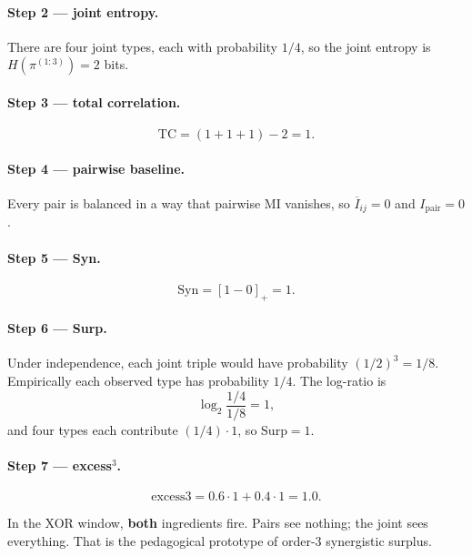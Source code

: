 \documentclass[11pt,a4paper]{article}
\begin{document}
\paragraph{Step 2 --- joint entropy.}
There are four joint types, each with probability $1/4$, so the joint
entropy is $H(\pi^{(1:3)})=2$ bits.

\paragraph{Step 3 --- total correlation.}
\begin{equation*}
\mathrm{TC}
=
(1+1+1)-2
=
1.
\end{equation*}

\paragraph{Step 4 --- pairwise baseline.}
Every pair is balanced in a way that pairwise MI vanishes, so
$\overline{I}_{ij}=0$ and $I_{\mathrm{pair}}=0$.

\paragraph{Step 5 --- Syn.}
\begin{equation*}
\mathrm{Syn}
=
[1-0]_+
=
1.
\end{equation*}

\paragraph{Step 6 --- Surp.}
Under independence, each joint triple would have probability
$(1/2)^3=1/8$. Empirically each observed type has probability $1/4$. The
log-ratio is
\begin{equation*}
\log_2\frac{1/4}{1/8}=1,
\end{equation*}
and four types each contribute $(1/4)\cdot 1$, so $\mathrm{Surp}=1$.

\paragraph{Step 7 --- excess$^3$.}
\begin{equation*}
\mathrm{excess3}
=
0.6\cdot 1 + 0.4\cdot 1
=
1.0.
\end{equation*}

\begin{keyidea}
In the XOR window, \textbf{both} ingredients fire. Pairs see nothing; the
joint sees everything. That is the pedagogical prototype of order-3
synergistic surplus.
\end{keyidea}
\end{document}
